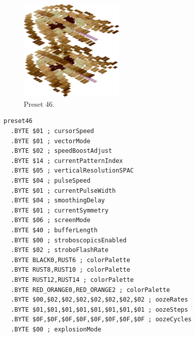 \begin{minipage}[b]{0.48\linewidth}
\begin{figure}[H]                                                          
  \centering                                                             
  \begin{adjustbox}{width=5cm,center}                                   
  \includegraphics[width=5cm]{src/colorspace_presets/preset46-45.png}%
  \end{adjustbox}                                                        
\caption*{Preset 46.}                                           
\end{figure}                                                               
\end{minipage}
\hspace{0.1cm}
\begin{minipage}[b]{0.48\linewidth}                                       
\begin{lstlisting}[basicstyle=\ttfamily\tiny]
preset46
  .BYTE $01 ; cursorSpeed
  .BYTE $01 ; vectorMode
  .BYTE $02 ; speedBoostAdjust
  .BYTE $14 ; currentPatternIndex
  .BYTE $05 ; verticalResolutionSPAC
  .BYTE $04 ; pulseSpeed
  .BYTE $01 ; currentPulseWidth
  .BYTE $04 ; smoothingDelay
  .BYTE $01 ; currentSymmetry
  .BYTE $06 ; screenMode
  .BYTE $40 ; bufferLength
  .BYTE $00 ; stroboscopicsEnabled
  .BYTE $02 ; stroboFlashRate
  .BYTE BLACK0,RUST6 ; colorPalette
  .BYTE RUST8,RUST10 ; colorPalette
  .BYTE RUST12,RUST14 ; colorPalette
  .BYTE RED_ORANGE0,RED_ORANGE2 ; colorPalette
  .BYTE $00,$02,$02,$02,$02,$02,$02,$02 ; oozeRates
  .BYTE $01,$01,$01,$01,$01,$01,$01,$01 ; oozeSteps
  .BYTE $0F,$0F,$0F,$0F,$0F,$0F,$0F,$0F ; oozeCycles
  .BYTE $00 ; explosionMode
\end{lstlisting}
\end{minipage}

